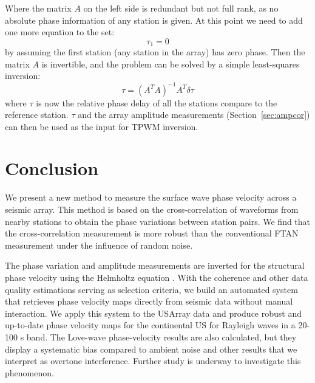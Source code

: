 Where the matrix $A$ on the left side is redundant but not full rank, as no absolute phase information of any station is given. At this point we need to add one more equation to the set:
\begin{equation}
\tau_1 = 0
\end{equation}
by assuming the first station (any station in the array) has zero phase. Then the matrix $A$ is invertible, and the problem can be solved by a simple least-squares inversion:
\begin{equation}
\tau = (A^TA)^{-1}A^T \delta\tau
\end{equation}
where $\tau$ is now the relative phase delay of all the stations compare to the reference station. $\tau$ and the array amplitude measurements (Section~\ref{sec:ampcor}) can then be used as the input for TPWM inversion.

\section{Conclusion}

We present a new method to measure the surface wave phase velocity across a seismic array. This method is based on the cross-correlation of waveforms from nearby stations to obtain the phase variations between station pairs. We find that the cross-correlation measurement is more robust than the conventional FTAN measurement under the influence of random noise.

The phase variation and amplitude measurements are inverted for the structural phase velocity using the Helmholtz equation \citep{Lin:2011fw}. With the coherence and other data quality estimations serving as selection criteria, we build an automated system that retrieves phase velocity maps directly from seismic data without manual interaction. We apply this system to the USArray data and produce robust and up-to-date phase velocity maps for the continental US for Rayleigh waves in a 20-100 s band. The Love-wave phase-velocity results are also calculated, but they display a systematic bias compared to ambient noise and other results that we interpret as overtone interference.  Further study is underway to investigate this phenomenon.



